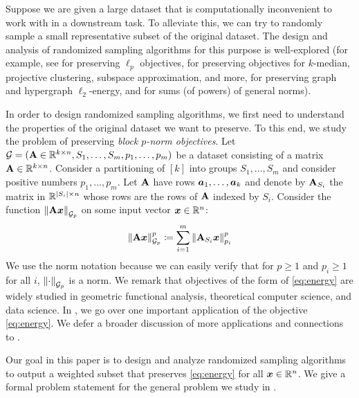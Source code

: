 \documentclass[11pt]{article}
\numberwithin{equation}{section}
\begin{document}
Suppose we are given a large dataset that is computationally inconvenient to work with in a downstream task. To alleviate this, we can try to randomly sample a small representative subset of the original dataset. The design and analysis of randomized sampling algorithms for this purpose is well-explored (for example, see \cite{ss08,mmwy21,wy22_oneshot,wy23_sens} for preserving $\ell_p$ objectives, \cite{fl11} for preserving objectives for $k$-median, projective clustering, subspace approximation, and more, \cite{ss08,kkty21a,jls22,lee22} for preserving graph and hypergraph $\ell_2$-energy, and \cite{jlls23} for sums (of powers) of general norms).

In order to design randomized sampling algorithms, we first need to understand the properties of the original dataset we want to preserve. To this end, we study the problem of preserving \textit{block $p$-norm objectives}. Let $\mathcal{G} = (\mathbf{A} \in \mathbb{R}^{k\times n}, S_1,\dots,S_m, p_1,\dots,p_m)$ be a dataset consisting of a matrix $\mathbf{A} \in \mathbb{R}^{k\times n}$. Consider a partitioning of $[k]$ into groups $S_1,\dots,S_m$ and consider positive numbers $p_1,\dots,p_m$. Let $\mathbf{A}$ have rows $\bm{a}_1,\dots,\bm{a}_k$ and denote by $\mathbf{A}_{S_i}$ the matrix in $\mathbb{R}^{\left\lvert S_i \right\rvert \times n}$ whose rows are the rows of $\mathbf{A}$ indexed by $S_i$. Consider the function $\left\lVert \mathbf{A}\bm{x} \right\rVert_{\mathcal{G}_{p}}$ on some input vector $\bm{x} \in \mathbb{R}^n$:
\begin{align}
    \left\lVert \mathbf{A}\bm{x} \right\rVert_{\mathcal{G}_{p}}^p \coloneqq \sum_{i=1}^m \left\lVert \mathbf{A}_{S_i}\bm{x} \right\rVert_{p_i}^p \label{eq:energy}
\end{align}
We use the norm notation because we can easily verify that for $p \ge 1$ and $p_i \ge 1$ for all $i$, $\left\lVert \cdot \right\rVert_{\mathcal{G}_{p}}$ is a norm. We remark that objectives of the form of \eqref{eq:energy} are widely studied in geometric functional analysis, theoretical computer science, and data science. In , we go over one important application of the objective \eqref{eq:energy}. We defer a broader discussion of more applications and connections to .

Our goal in this paper is to design and analyze randomized sampling algorithms to output a weighted subset that preserves \eqref{eq:energy} for all $\bm{x} \in \mathbb{R}^n$. We give a formal problem statement for the general problem we study in . 
\end{document}
